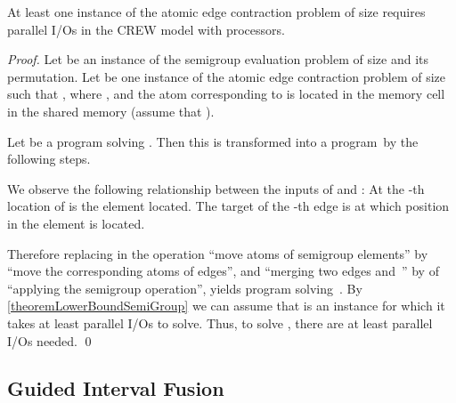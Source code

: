 \documentclass[envcountsame]{llncs}
\def\bOm#1{\printmath{\Omega \left(#1\right)}}
\begin{document}
\begin{theorem} 
\label{lemmaAtomicEdgeContractionRestate}
At least one instance of the atomic edge contraction problem of size  requires \bOm{\permp{\inputSize,\memorySize,\blockSize}} parallel I/Os in the CREW \linebreak\bridgingPEM model with  processors.
\end{theorem}



\begin{proof}
Let \instSE be an instance of the semigroup evaluation problem of size  and \perm{} its permutation. 
Let \instanceAtomicListRanking be one instance of the atomic edge contraction problem of size  such that , where , and the atom corresponding to  is located in the memory cell  in the shared memory (assume that ). 

Let \programAtomicListRanking be a program solving \instanceAtomicListRanking.
Then this is transformed into a program~\progSE by the following steps.

We observe the following relationship between the inputs of \instSE and \instanceAtomicListRanking:
At the -th location of \instSE is the element  located.
The target of the -th edge is  at which position in \instSE the element  is located.

Therefore replacing in \programAtomicListRanking the operation ``move atoms of semigroup elements'' by ``move the corresponding atoms of edges'', and ``merging two edges  and~'' by of ``applying the semigroup operation'', yields program \progSE solving~\instSE.
By \autoref{theoremLowerBoundSemiGroup} we can assume that \instSE is an instance for which it takes at least \bOm{\permp{\inputSize,\memorySize,\blockSize}} parallel I/Os to solve. 
Thus, to solve \instanceAtomicListRanking, there are at least \bOm{\permp{\inputSize,\memorySize,\blockSize}} parallel I/Os needed.
\qed
\end{proof}

\subsection{Guided Interval Fusion}
\label{appendixGIF}
\end{document}
